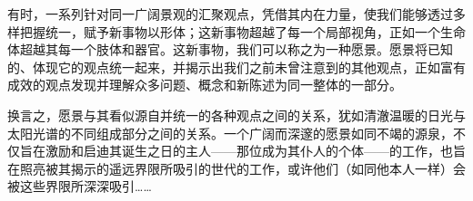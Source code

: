 有时，一系列针对同一广阔景观的汇聚观点，凭借其内在力量，使我们能够透过多样把握统一，赋予新事物以形体；这新事物超越了每一个局部视角，正如一个生命体超越其每一个肢体和器官。这新事物，我们可以称之为一种愿景。愿景将已知的、体现它的观点统一起来，并揭示出我们之前未曾注意到的其他观点，正如富有成效的观点发现并理解众多问题、概念和新陈述为同一整体的一部分。

换言之，愿景与其看似源自并统一的各种观点之间的关系，犹如清澈温暖的日光与太阳光谱的不同组成部分之间的关系。一个广阔而深邃的愿景如同不竭的源泉，不仅旨在激励和启迪其诞生之日的主人——那位成为其仆人的个体——的工作，也旨在照亮被其揭示的遥远界限所吸引的世代的工作，或许他们（如同他本人一样）会被这些界限所深深吸引……
